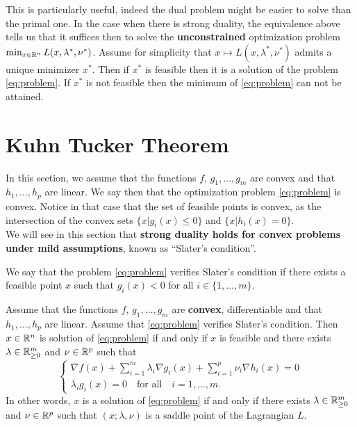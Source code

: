 \documentclass[11pt,nocut]{article}
\begin{document}
This is particularly useful, indeed the dual problem might be easier to solve than the primal one. In the case when there is strong duality, the equivalence above tells us that it suffices then to solve the \textbf{unconstrained} optimization problem $\min_{x \in \mathbb{R}^n} L(x,\lambda^*,\nu^*)$.
Assume for simplicity that $x \mapsto L(x,\lambda^*,\nu^*)$ admits a unique minimizer $x^*$. Then if $x^*$ is feasible then it is a solution of the problem \eqref{eq:problem}. 
If $x^*$ is not feasible then the minimum of \eqref{eq:problem} can not be attained.

\section{Kuhn Tucker Theorem}

In this section, we assume that the functions $f$, $g_1, \dots, g_m$ are convex and that $h_1, \dots, h_p$ are linear. We say then that the optimization problem \eqref{eq:problem} is convex.
Notice in that case that the set of feasible points is convex, as the intersection of the convex sets $\{x | g_i(x) \leq 0 \}$ and $\{x|h_i(x) =0\}$.
\\

We will see in this section that \textbf{strong duality holds for convex problems under mild assumptions}, known as ``Slater's condition''.


\begin{definition}
	We say that the problem \eqref{eq:problem} verifies Slater's condition if there exists a feasible point $x$ such that $g_i(x) < 0$ for all $i \in \{1, \dots, m\}$.
\end{definition}

\begin{theorem}\label{th:kuhn_tucker}
	Assume that the functions $f$, $g_1, \dots, g_m$ are \textbf{convex}, differentiable and that $h_1, \dots, h_p$ are linear. Assume that \eqref{eq:problem} verifies Slater's condition.
	Then 
	$x \in \mathbb{R}^n$ is solution of \eqref{eq:problem} if and only if $x$ is feasible and there exists $\lambda \in \mathbb{R}_{\geq 0}^m$ and $\nu \in \mathbb{R}^p$ such that
	\begin{equation}\label{eq:kkt}
		\begin{cases}
			\displaystyle \nabla f(x) + \sum_{i=1}^m \lambda_i \nabla g_i(x) + \sum_{i=1}^p \nu_i \nabla h_i(x) = 0 \\
		\lambda_i g_i(x) = 0 \quad \text{for all} \quad i=1, \dots, m.
		\end{cases}
	\end{equation}
	In other words, $x$ is a solution of \eqref{eq:problem} if and only if there exists $\lambda \in \mathbb{R}_{\geq 0}^m$ and $\nu \in \mathbb{R}^p$ such that $(x; \lambda, \nu)$ is a saddle point of the Lagrangian $L$.
\end{theorem}
\end{document}
